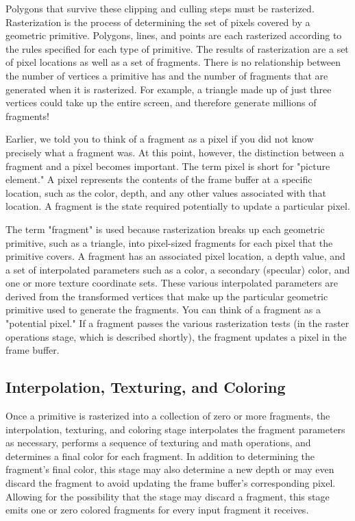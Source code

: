 \documentclass{book}
\begin{document}
Polygons that survive these clipping and culling steps must be rasterized. Rasterization is the process of determining the set of pixels covered by a geometric primitive. Polygons, lines, and points are each rasterized according to the rules specified for each type of primitive. The results of rasterization are a set of pixel locations as well as a set of fragments. There is no relationship between the number of vertices a primitive has and the number of fragments that are generated when it is rasterized. For example, a triangle made up of just three vertices could take up the entire screen, and therefore generate millions of fragments!

Earlier, we told you to think of a fragment as a pixel if you did not know precisely what a fragment was. At this point, however, the distinction between a fragment and a pixel becomes important. The term pixel is short for "picture element." A pixel represents the contents of the frame buffer at a specific location, such as the color, depth, and any other values associated with that location. A fragment is the state required potentially to update a particular pixel.

The term "fragment" is used because rasterization breaks up each geometric primitive, such as a triangle, into pixel-sized fragments for each pixel that the primitive covers. A fragment has an associated pixel location, a depth value, and a set of interpolated parameters such as a color, a secondary (specular) color, and one or more texture coordinate sets. These various interpolated parameters are derived from the transformed vertices that make up the particular geometric primitive used to generate the fragments. You can think of a fragment as a "potential pixel." If a fragment passes the various rasterization tests (in the raster operations stage, which is described shortly), the fragment updates a pixel in the frame buffer.

\subsection*{Interpolation, Texturing, and Coloring}

Once a primitive is rasterized into a collection of zero or more fragments, the interpolation, texturing, and coloring stage interpolates the fragment parameters as necessary, performs a sequence of texturing and math operations, and determines a final color for each fragment. In addition to determining the fragment's final color, this stage may also determine a new depth or may even discard the fragment to avoid updating the frame buffer's corresponding pixel. Allowing for the possibility that the stage may discard a fragment, this stage emits one or zero colored fragments for every input fragment it receives.
\end{document}
